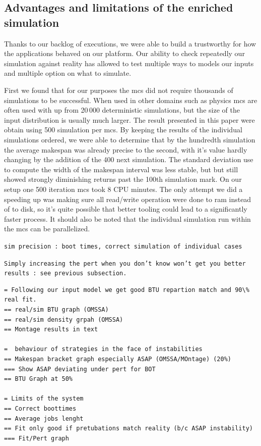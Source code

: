 \documentclass[10pt,conference,compsocconf]{IEEEtran}
\begin{document}
\subsection{Advantages and limitations of the enriched simulation}\label{sec:lim}

Thanks to our backlog of executions, we were able to build a trustworthy for how
the applications behaved on our platform. Our ability to check repeatedly our
simulation against reality has allowed to test multiple ways to models our
inputs and multiple option on what to simulate. 

First we found that for our purposes the \ac{mcs} did not require thousands of
simulations to be successful. When used in other domains such as physics
\acp{mc} are often used with up from 20\,000 deterministic simulations, but the
size of the input distribution is usually much larger. The result presented in
this paper were obtain using 500 simulation per \ac{mcs}. By keeping the results
of the individual simulations ordered, we were able to determine that by the
hundredth simulation the average makespan was already precise to the second,
with it's value hardly changing by the addition of the 400 next simulation. The
standard deviation use to compute the width of the makespan interval was less
stable, but but still showed strongly diminishing returns past the 100th
simulation mark. On our setup one 500 iteration \ac{mcs} took 8 CPU minutes. The
only attempt we did a speeding up was making sure all read/write operation were
done to ram instead of to disk, so it's quite possible that better tooling could
lead to a significantly faster process. It should also be noted that the
individual simulation run within the \ac{mcs} can be parallelized.

\texttt{sim precision : boot times, correct simulation of individual cases}

\texttt{Simply increasing the pert when you don't know won't get you better
results : see previous subsection.}

\begin{verbatim}
= Following our input model we get good BTU repartion match and 90\% real fit.
== real/sim BTU graph (OMSSA)
== real/sim density grpah (OMSSA)
== Montage results in text

=  behaviour of strategies in the face of instabilities
== Makespan bracket graph especially ASAP (OMSSA/MOntage) (20%)
=== Show ASAP deviating under pert for BOT
== BTU Graph at 50%

= Limits of the system
== Correct boottimes
== Average jobs lenght
== Fit only good if pretubations match reality (b/c ASAP instability)
=== Fit/Pert graph

\end{verbatim}
\end{document}
